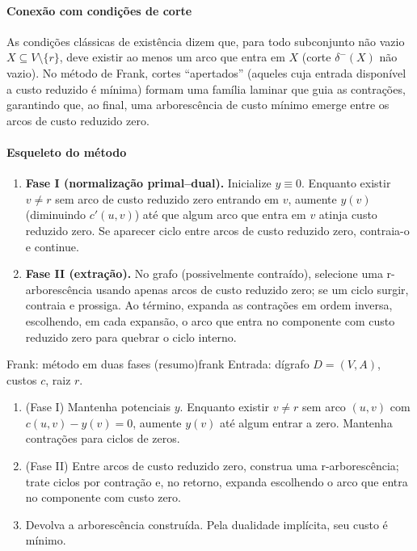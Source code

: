 \documentclass[12pt,a4paper]{article}
\begin{document}
\paragraph{Conexão com condições de corte}
As condições clássicas de existência dizem que, para todo subconjunto não vazio \(X\subseteq V\setminus\{r\}\), deve existir ao menos um arco que entra em \(X\) (corte \(\delta^-(X)\) não vazio). No método de Frank, cortes “apertados” (aqueles cuja entrada disponível a custo reduzido é mínima) formam uma família laminar que guia as contrações, garantindo que, ao final, uma arborescência de custo mínimo emerge entre os arcos de custo reduzido zero.

\paragraph{Esqueleto do método}
\begin{enumerate}\setlength{\itemsep}{2pt}
    \item \textbf{Fase I (normalização primal–dual).} Inicialize \(y\equiv 0\). Enquanto existir \(v\neq r\) sem arco de custo reduzido zero entrando em \(v\), aumente \(y(v)\) (diminuindo \(c'(u,v)\)) até que algum arco que entra em \(v\) atinja custo reduzido zero. Se aparecer ciclo entre arcos de custo reduzido zero, contraia-o e continue.
    \item \textbf{Fase II (extração).} No grafo (possivelmente contraído), selecione uma r-arborescência usando apenas arcos de custo reduzido zero; se um ciclo surgir, contraia e prossiga. Ao término, expanda as contrações em ordem inversa, escolhendo, em cada expansão, o arco que entra no componente com custo reduzido zero para quebrar o ciclo interno.
\end{enumerate}

\begin{algobox}{Frank: método em duas fases (resumo)}{frank}
Entrada: dígrafo \(D=(V,A)\), custos \(c\), raiz \(r\).
\begin{enumerate}\setlength{\itemsep}{2pt}
    \item (Fase I) Mantenha potenciais \(y\). Enquanto existir \(v\neq r\) sem arco \((u,v)\) com \(c(u,v)-y(v)=0\), aumente \(y(v)\) até algum entrar a zero. Mantenha contrações para ciclos de zeros.
    \item (Fase II) Entre arcos de custo reduzido zero, construa uma r-arborescência; trate ciclos por contração e, no retorno, expanda escolhendo o arco que entra no componente com custo zero.
    \item Devolva a arborescência construída. Pela dualidade implícita, seu custo é mínimo.
\end{enumerate}
\end{algobox}
\end{document}
